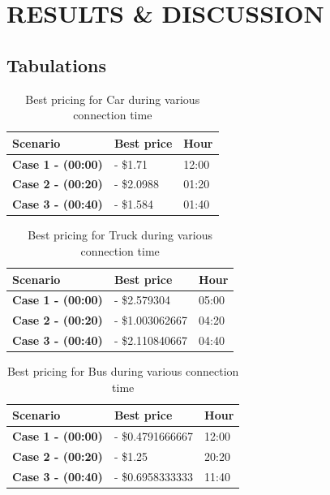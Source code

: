 
	\chapter{RESULTS \& DISCUSSION}
	\label{chap:results}
	
	\section{Tabulations}
		\begin{table}[h]
			\centering
			\begin{tabular}{|l|l|l|}
				\hline
				\textbf{Scenario}         & \textbf{Best price} & \textbf{Hour} \\ \hline
				\textbf{Case 1 - (00:00)} & - \$1.71            & 12:00         \\ \hline
				\textbf{Case 2 - (00:20)} & - \$2.0988          & 01:20         \\ \hline
				\textbf{Case 3 - (00:40)} & - \$1.584           & 01:40         \\ \hline
			\end{tabular}
			\caption{Best pricing for Car during various connection time}
		\end{table}

		\begin{table}[h]
			\centering
			\begin{tabular}{|l|l|l|}
				\hline
				\textbf{Scenario}         & \textbf{Best price} & \textbf{Hour} \\ \hline
				\textbf{Case 1 - (00:00)}  & - \$2.579304 & 05:00         \\ \hline
				\textbf{Case 2 - (00:20)} & - \$1.003062667 & 04:20         \\ \hline
				\textbf{Case 3 - (00:40)} & - \$2.110840667 & 04:40         \\ \hline
			\end{tabular}
			\caption{Best pricing for Truck during various connection time}
		\end{table}



		\begin{table}[h]
			\centering
			\begin{tabular}{|l|l|l|}
				\hline
				\textbf{Scenario}         & \textbf{Best price} & \textbf{Hour} \\ \hline
				\textbf{Case 1 - (00:00)}  & - \$0.4791666667   & 12:00         \\ \hline
				\textbf{Case 2 - (00:20)} & - \$1.25         & 20:20         \\ \hline
				\textbf{Case 3 - (00:40)} & - \$0.6958333333 & 11:40         \\ \hline
			\end{tabular}
			\caption{Best pricing for Bus during various connection time}
		\end{table}

